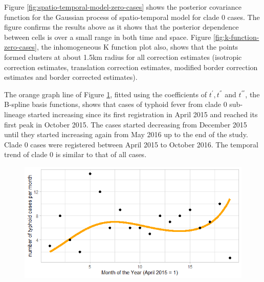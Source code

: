 Figure \ref{fig:spatio-temporal-model-zero-cases} shows the posterior covariance function for the Gaussian process of spatio-temporal model for clade 0 cases. The figure confirms the results above as it shows that the posterior dependence between cells is over a small range in both time and space. Figure \ref{fig:k-function-zero-cases}, the inhomogeneous K function plot also, shows that the points formed clusters at about 1.5km radius for all correction estimates (isotropic correction estimates, translation correction estimates, modified border correction estimates and border corrected estimates).

The orange graph line of Figure \ref{fig:temporal-distribution-zero-cases}, fitted using the coefficients of $t^{'}, t^{''}$ and $t^{'''}$, the B-spline basis functions, shows that cases of typhoid fever from clade 0 sub-lineage started increasing since its first registration in April 2015 and reached its first peak in October 2015. The cases started decreasing from December 2015 until they started increasing again from May 2016 up to the end of the study. Clade 0 cases were registered between April 2015 to October 2016. The temporal trend of clade 0 is similar to that of all cases.

\begin{figure}[H]
    \begin{center}
        \includegraphics[scale=0.9]{Long term trend of temporal model - Major 0.png}
    \end{center}
     \label{fig:temporal-distribution-zero-cases}
\end{figure}

